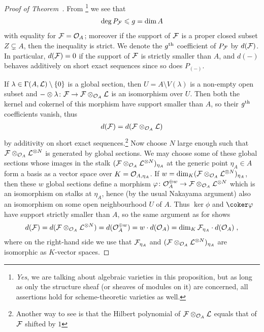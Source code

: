 \documentclass[a4paper,parskip=half,numbers=enddot, DIV=12]{scrreprt}
\renewcommand{\leq}{\leqslant}
\begin{document}
\begin{proof}[Proof of Theorem~]
	From \cite[Proposition~3.1.3]{alg2}\footnote{\emph{Yes}, we are talking about algebraic varieties in this proposition, but as long as only the structure sheaf (or sheaves of modules on it) are concerned, all assertions hold for scheme-theoretic varieties as well.} we see that
	\begin{align*}
		\deg P_{\Ff}\leq g=\dim A
	\end{align*}
	with equality for $\mathcal{F}=\mathcal{O}_A$; moreover if the support of $\mathcal{F}$ is a proper closed subset $Z\subsetneq A$, then the inequality is strict. We denote the $g^{\text{th}}$ coefficient of $P_{\mathcal{F}}$ by $d(\mathcal{F})$. In particular, $d(\mathcal{F})=0$ if the support of $\mathcal{F}$ is strictly smaller than $A$, and $d(-)$ behaves additively on short exact sequences since so does $P_{(-)}$.
	
	If $\lambda\in\Gamma(A,\mathcal{L})\setminus \{0\}$ is a global section, then $U=A\setminus V(\lambda)$ is a non-empty open subset and $-\otimes\lambda\colon \Ff\morphism\Ff\otimes_{\Oo_A}\Ll$ is an isomorphism over $U$. Then both the kernel and cokernel of this morphism have support smaller than $A$, so their $g^{\text{th}}$ coefficients vanish, thus
	\begin{align}\lbl{eq:dLShift}
		d(\Ff)=d(\Ff\otimes_{\Oo_A}\Ll)
	\end{align}
	by additivity on short exact sequences.\footnote{Another way to see  is that the Hilbert polynomial of $\mathcal{F}\otimes_{\mathcal{O}_A}\mathcal{L}$ equals that of $\mathcal{F}$ shifted by $1$} Now choose $N$ large enough such that $\mathcal{F}\otimes_{\mathcal{O}_A}\mathcal{L}^{\otimes N}$ is generated by global sections. We may choose some of these global sections whose images in the stalk $(\mathcal{F}\otimes_{\mathcal{O}_A}\mathcal{L}^{\otimes N})_{\eta_A}$ at the generic point $\eta_A\in A$ form a basis as a vector space over $K=\mathcal{O}_{A,\eta_A}$. If $w=\dim_K(\mathcal{F}\otimes_{\mathcal{O}_A}\mathcal{L}^{\otimes N})_{\eta_A}$, then these $w$ global sections define a morphism $\phi\colon \Oo_A^{\oplus w}\morphism \Ff\otimes_{\Oo_A}\Ll^{\otimes N}$ which is an isomorphism on stalks at $\eta_A$, hence (by the usual Nakayama argument) also an isomorphism on some open neighbourhood $U$ of $A$. Thus $\ker\phi$ and $\coker \phi$ have support strictly smaller than $A$, so the same argument as for  shows
	\begin{align}\lbl{eq:dFormula}
		d(\Ff)=d(\Ff\otimes_{\Oo_A}\Ll^{\otimes N})=d(\Oo_A^{\oplus w})=w\cdot d(\Oo_A)=\dim_K\Ff_{\eta_A}\cdot d(\Oo_A)\;,
	\end{align}
	where on the right-hand side we use that $\mathcal{F}_{\eta_A}$ and $(\mathcal{F}\otimes_{\mathcal{O}_A}\mathcal{L}^{\otimes N})_{\eta_A}$ are isomorphic as $K$-vector spaces.
	

\end{proof}
\end{document}
